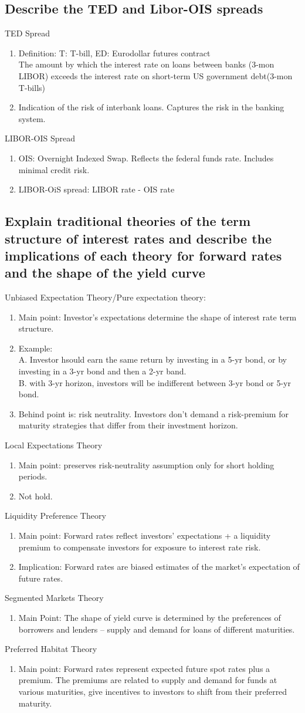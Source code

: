 \documentclass{article}
\newcommand{\be}{\begin{enumerate}}
\newcommand{\ee}{\end{enumerate}}
\begin{document}
\subsection{Describe the TED and Libor-OIS spreads}
TED Spread
\be
    \item Definition: T: T-bill, ED: Eurodollar futures contract
        \\The amount by which the interest rate on loans between banks (3-mon LIBOR)
        exceeds the interest rate on short-term US government debt(3-mon T-bills)
    \item Indication of the risk of interbank loans. Captures the risk in the banking system.
\ee
LIBOR-OIS Spread
\be
    \item OIS: Overnight Indexed Swap. Reflects the federal funds rate. Includes minimal credit risk.
    \item LIBOR-OiS spread: LIBOR rate - OIS rate
\ee
\subsection{Explain traditional theories of the term structure of interest rates
and describe the implications of each theory for forward rates and the shape of the
yield curve}
Unbiased Expectation Theory/Pure expectation theory:
\be
    \item Main point: Investor's expectations determine the shape of interest rate
        term structure. 
    \item Example: 
        \\A. Investor hsould earn the same return by investing in a 5-yr bond, or by
        investing in a 3-yr bond and then a 2-yr band.
        \\B. with 3-yr horizon, investors will be indifferent between 3-yr bond or 5-yr bond.
    \item Behind point is: risk neutrality. Investors don't demand a risk-premium for 
        maturity strategies that differ from their investment horizon.
\ee
Local Expectations Theory
\be
    \item Main point: preserves risk-neutrality assumption only for short holding periods.
    \item Not hold.
\ee
Liquidity Preference Theory
\be
    \item Main point: Forward rates reflect investors' expectations + a liquidity premium
        to compensate investors for exposure to interest rate risk.
    \item Implication:  Forward rates  are biased estimates of the market's expectation of
        future rates.
\ee
Segmented Markets Theory
\be
    \item Main Point: The shape of yield curve is determined by the preferences of borrowers
        and lenders -- supply and demand for loans of different maturities.
\ee
Preferred Habitat Theory
\be
    \item Main point: Forward rates represent expected future spot rates plus a premium. The
        premiums are related to supply and demand for funds at various maturities, give incentives
        to investors to shift from their preferred maturity.
\ee
\end{document}
